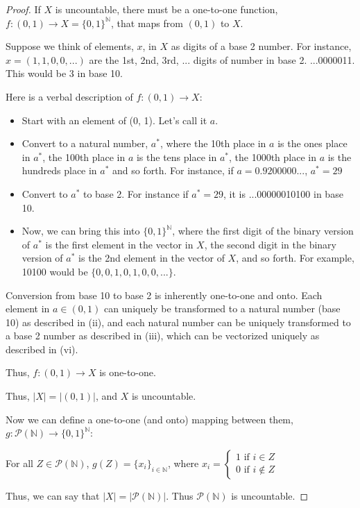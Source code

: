 \documentclass[12pt,letterpaper, onecolumn]{exam}
\newcommand{\ifc}{\textrm{ if }}
\newcommand{\nat}{\mathbb{N}}
\newcommand{\power}{\mathcal{P}}
\begin{document}
\begin{questions}
\begin{solution}
\begin{proof}
        If $X$ is uncountable, there must be a one-to-one function, $f: (0, 1) \to X = \{0, 1\}^{\nat}$, that maps from $(0, 1)$ to $X$.

        Suppose we think of elements, $x$, in $X$ as digits of a base 2 number. For instance, $x = (1, 1, 0, 0, ...)$ are the 1st, 2nd, 3rd, ... digits of number in base 2. ...0000011. This would be 3 in base 10. 

        Here is a verbal description of $f: (0, 1) \to X$:
        \begin{itemize}
            \item[i.] Start with an element of (0, 1). Let's call it $a$.
            \item[ii.] Convert to a natural number, $a^*$, where the 10th place in $a$ is the ones place in $a^*$, the 100th place in $a$ is the tens place in $a^*$, the 1000th place in $a$ is the hundreds place in $a^*$ and so forth. For instance, if $a = 0.9200000...$, $a^* = 29$
            \item[iii.] Convert to $a^*$ to base 2. For instance if $a^* = 29$, it is ...00000010100 in base 10. 
            \item[iv.] Now, we can bring this into $\{0, 1\}^\nat$, where the first digit of the binary version of $a^*$ is the first element in the vector in $X$, the second digit in the binary version of $a^*$ is the 2nd element in the vector of $X$, and so forth. For example, 10100 would be $\{0, 0, 1, 0, 1, 0, 0, ...\}$.
        \end{itemize}
    Conversion from base 10 to base 2 is inherently one-to-one and onto. Each element in $a \in (0,1)$ can uniquely be transformed to a natural number (base 10) as described in (ii), and each natural number can be uniquely transformed to a base 2 number as described in (iii), which can be vectorized uniquely as described in (vi). 

    Thus, $f:(0,1) \to X$ is one-to-one.

    Thus, $|X| = |(0, 1)|$, and $X$ is uncountable. 

    Now we can define a one-to-one (and onto) mapping between them, $g: \power(\nat) \to \{0, 1\}^\nat$:

    For all $Z \in \power(\nat)$, $g(Z) = \{x_i\}_{i \in \nat}$, where $x_i = \begin{cases}
        1 \ifc i \in Z \\
        0 \ifc i \notin Z
    \end{cases}$

    Thus, we can say that $|X| = |\power(\nat)|$. Thus $\power(\nat)$ is uncountable. 
    \end{proof}
    \end{solution}


\end{questions}
\end{document}
